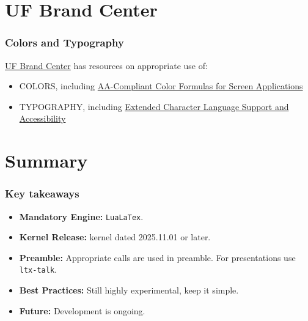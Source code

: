 \documentclass{ltx-talk}
\begin{document}
	
\section{UF Brand Center}
	
	\begin{frame}
		\frametitle{Colors and Typography}
		\href{https://brandcenter.ufl.edu/}{UF Brand Center} has resources on appropriate use of:
		\begin{itemize}
			\item COLORS, including \href{https://brandcenter.ufl.edu/colors/}{AA-Compliant Color Formulas for Screen Applications}
			\item TYPOGRAPHY, including \href{https://brandcenter.ufl.edu/typography/}{Extended Character Language Support and Accessibility}
		\end{itemize} 
	\end{frame}

\section{Summary}
	\begin{frame}
		\frametitle{Key takeaways}
		\begin{itemize}[<+->]
			\item \textbf{Mandatory Engine:} \texttt{LuaLaTex}.
			\item \textbf{Kernel Release:} kernel dated 2025.11.01 or later.
			\item \textbf{Preamble:} Appropriate calls are used in preamble. For presentations use \texttt{ltx-talk}. 
			\item \textbf{Best Practices:} Still highly experimental, keep it simple.  
			\item \textbf{Future:} Development is ongoing.
		\end{itemize}
	\end{frame}
\end{document}
